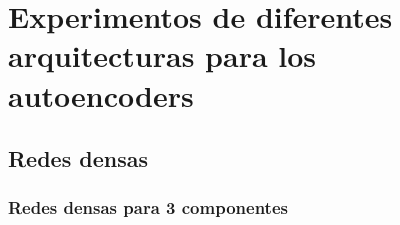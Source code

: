 
\chapter{Experimentos de diferentes arquitecturas para los autoencoders} %

\label{chapter:AppendixA} %

\section{Redes densas}
\label{section:nn}

\subsection{Redes densas para 3 componentes}

